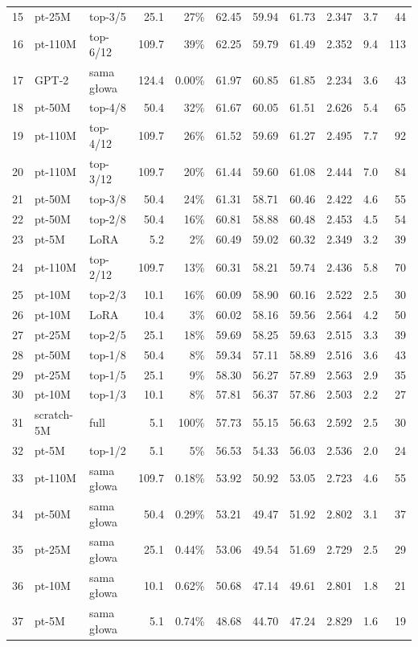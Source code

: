 {\begin{longtable}{@{}rllrrrrrrrr@{}}
15 & pt-25M & top-3/5 & 25.1 & 27\% & 62.45 & 59.94 & 61.73 & 2.347 & 3.7 & 44 \\
16 & pt-110M & top-6/12 & 109.7 & 39\% & 62.25 & 59.79 & 61.49 & 2.352 & 9.4 & 113 \\
\rowcolor{orange!12}17 & GPT-2 & sama głowa & 124.4 & 0.00\% & 61.97 & 60.85 & 61.85 & 2.234 & 3.6 & 43 \\
18 & pt-50M & top-4/8 & 50.4 & 32\% & 61.67 & 60.05 & 61.51 & 2.626 & 5.4 & 65 \\
19 & pt-110M & top-4/12 & 109.7 & 26\% & 61.52 & 59.69 & 61.27 & 2.495 & 7.7 & 92 \\
20 & pt-110M & top-3/12 & 109.7 & 20\% & 61.44 & 59.60 & 61.08 & 2.444 & 7.0 & 84 \\
21 & pt-50M & top-3/8 & 50.4 & 24\% & 61.31 & 58.71 & 60.46 & 2.422 & 4.6 & 55 \\
22 & pt-50M & top-2/8 & 50.4 & 16\% & 60.81 & 58.88 & 60.48 & 2.453 & 4.5 & 54 \\
23 & pt-5M & LoRA & 5.2 & 2\% & 60.49 & 59.02 & 60.32 & 2.349 & 3.2 & 39 \\
24 & pt-110M & top-2/12 & 109.7 & 13\% & 60.31 & 58.21 & 59.74 & 2.436 & 5.8 & 70 \\
25 & pt-10M & top-2/3 & 10.1 & 16\% & 60.09 & 58.90 & 60.16 & 2.522 & 2.5 & 30 \\
26 & pt-10M & LoRA & 10.4 & 3\% & 60.02 & 58.16 & 59.56 & 2.564 & 4.2 & 50 \\
27 & pt-25M & top-2/5 & 25.1 & 18\% & 59.69 & 58.25 & 59.63 & 2.515 & 3.3 & 39 \\
28 & pt-50M & top-1/8 & 50.4 & 8\% & 59.34 & 57.11 & 58.89 & 2.516 & 3.6 & 43 \\
29 & pt-25M & top-1/5 & 25.1 & 9\% & 58.30 & 56.27 & 57.89 & 2.563 & 2.9 & 35 \\
30 & pt-10M & top-1/3 & 10.1 & 8\% & 57.81 & 56.37 & 57.86 & 2.503 & 2.2 & 27 \\
31 & scratch-5M & full & 5.1 & 100\% & 57.73 & 55.15 & 56.63 & 2.592 & 2.5 & 30 \\
32 & pt-5M & top-1/2 & 5.1 & 5\% & 56.53 & 54.33 & 56.03 & 2.536 & 2.0 & 24 \\
33 & pt-110M & sama głowa & 109.7 & 0.18\% & 53.92 & 50.92 & 53.05 & 2.723 & 4.6 & 55 \\
34 & pt-50M & sama głowa & 50.4 & 0.29\% & 53.21 & 49.47 & 51.92 & 2.802 & 3.1 & 37 \\
35 & pt-25M & sama głowa & 25.1 & 0.44\% & 53.06 & 49.54 & 51.69 & 2.729 & 2.5 & 29 \\
36 & pt-10M & sama głowa & 10.1 & 0.62\% & 50.68 & 47.14 & 49.61 & 2.801 & 1.8 & 21 \\
37 & pt-5M & sama głowa & 5.1 & 0.74\% & 48.68 & 44.70 & 47.24 & 2.829 & 1.6 & 19 \\
\end{longtable}
}
